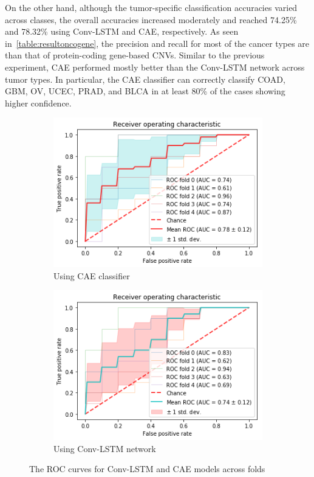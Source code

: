 \hspace*{3.5mm} On the other hand, although the tumor-specific classification accuracies varied across classes, the overall accuracies increased moderately and reached 74.25\% and 78.32\% using Conv-LSTM and CAE, respectively. As seen in~\cref{table:resultoncogene}, the precision and recall for most of the cancer types are than that of protein-coding gene-based CNVs. Similar to the previous experiment, CAE performed mostly better than the Conv-LSTM network across tumor types. In particular, the CAE classifier can correctly classify COAD, GBM, OV, UCEC, PRAD, and BLCA in at least 80\% of the cases showing higher confidence. 

\begin{figure}[h]
	\centering
	\begin{subfigure}{0.48\linewidth}
		\centering
		\includegraphics[width=\linewidth]{images/download1.png}
		\caption{Using CAE classifier}
	\end{subfigure}
	\begin{subfigure}{0.48\linewidth}
		\centering
		\includegraphics[width=\linewidth]{images/download2.png}
		\caption{Using Conv-LSTM network}
	\end{subfigure}
	\caption{The ROC curves for Conv-LSTM and CAE models across folds} 
	\label{fig:roc}
	 \vspace{-2mm}
\end{figure}

